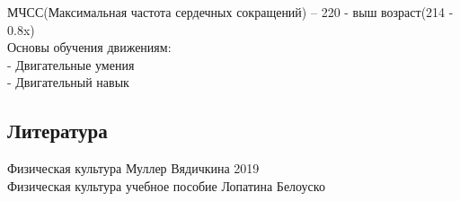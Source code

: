 \documentclass[a4paper, 12pt]{article}
\begin{document}
МЧСС(Максимальная частота сердечных сокращений) -- 220 - выш возраст(214 - 0.8x)\\

Основы обучения движениям:\\
- Двигательные умения\\
- Двигательный навык\\














\newpage
\subsection*{Литература} 
Физическая культура Муллер Вядичкина 2019\\
Физическая культура учебное пособие Лопатина Белоуско \\ 
\end{document}
